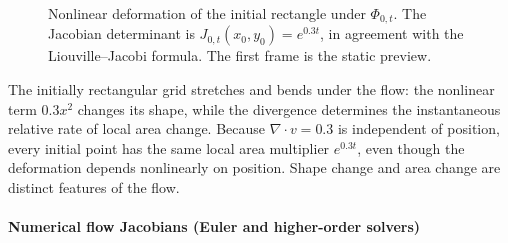 \documentclass[12pt,a4paper,oneside]{book}
\begin{document}
\begin{example}
\begin{figure}[htbp]
    \centering
    \caption{
        Nonlinear deformation of the initial rectangle under $\Phi_{0,t}$. The Jacobian determinant is $J_{0,t}(x_0,y_0)=e^{0.3t}$, in
        agreement with the Liouville--Jacobi formula. The first frame is the static preview.}
    \label{fig:liouville-jacobi-animation}
\end{figure}
\FloatBarrier

The initially rectangular grid stretches and bends under the flow: the nonlinear term $0.3x^2$ changes its shape, while
the divergence determines the instantaneous relative rate of local area change. Because $\nabla\cdot v=0.3$ is independent
of position, every initial point has the same local area multiplier $e^{0.3t}$, even though the deformation depends nonlinearly
on position. Shape change and area change are distinct features of the flow.
\end{example}

\paragraph{Numerical flow Jacobians (Euler and higher-order solvers)}
\label{src:p9q4discrete}
\end{document}
